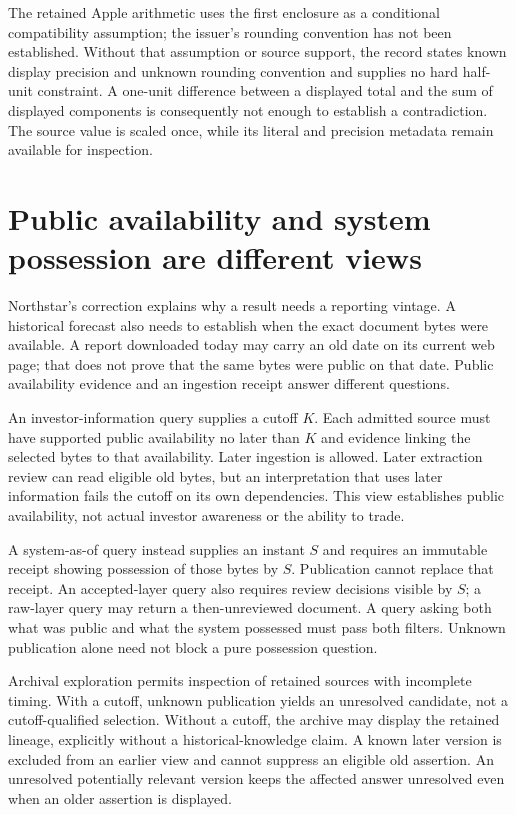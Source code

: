 The retained Apple arithmetic uses the first enclosure as a conditional
compatibility assumption; the issuer's rounding convention has not been
established. Without that assumption or source support, the record states
known display precision and unknown rounding convention and supplies no hard
half-unit constraint. A one-unit difference between a displayed total and the
sum of displayed components is consequently not enough to establish a
contradiction. The source value is scaled once, while its literal and precision
metadata remain available for inspection.

\section{Public availability and system possession are different views}
\label{sec:time-admission}

Northstar's correction explains why a result needs a reporting vintage. A
historical forecast also needs to establish when the exact document bytes were
available. A report downloaded today may carry an old date on its current web
page; that does not prove that the same bytes were public on that date. Public
availability evidence and an ingestion receipt answer different questions.

An investor-information query supplies a cutoff $K$. Each admitted source must
have supported public availability no later than $K$ and evidence linking the
selected bytes to that availability. Later ingestion is allowed. Later
extraction review can read eligible old bytes, but an interpretation that uses
later information fails the cutoff on its own dependencies. This view establishes
public availability, not actual investor awareness or the ability to trade.

A system-as-of query instead supplies an instant $S$ and requires an immutable
receipt showing possession of those bytes by $S$. Publication cannot replace
that receipt. An accepted-layer query also requires review decisions visible
by $S$; a raw-layer query may return a then-unreviewed document. A query asking
both what was public and what the system possessed must pass both filters.
Unknown publication alone need not block a pure possession question.

Archival exploration permits inspection of retained sources with incomplete
timing. With a cutoff, unknown publication yields an unresolved candidate,
not a cutoff-qualified selection. Without a cutoff, the archive may display
the retained lineage, explicitly without a historical-knowledge claim. A known
later version is excluded from an earlier view and cannot suppress an eligible
old assertion. An unresolved potentially relevant version keeps the affected
answer unresolved even when an older assertion is displayed.

